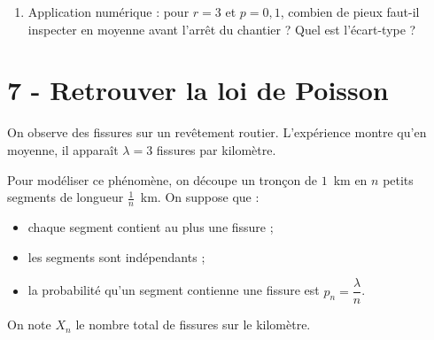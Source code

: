 \begin{enumerate}[resume]
{\begin{solution}
            C'est la \textbf{loi binomiale négative} (ou loi de Pascal) de paramètres $r$ et $p$.
        \end{solution}
    }{}
    
    \item Application numérique : pour $r = 3$ et $p = 0{,}1$, combien de pieux faut-il inspecter en moyenne avant l'arrêt du chantier ? Quel est l'écart-type ?
\end{enumerate}

\vspace{1em}

\section*{7 - Retrouver la loi de Poisson}

On observe des fissures sur un revêtement routier.
L'expérience montre qu'en moyenne, il apparaît $\lambda = 3$ fissures par kilomètre.

\medskip

Pour modéliser ce phénomène, on découpe un tronçon de $1$~km en $n$ petits segments de longueur $\frac{1}{n}$~km. On suppose que :
\begin{itemize}
    \item chaque segment contient au plus une fissure ;
    \item les segments sont indépendants ;
    \item la probabilité qu'un segment contienne une fissure est $p_n = \dfrac{\lambda}{n}$.
\end{itemize}

On note $X_n$ le nombre total de fissures sur le kilomètre.

